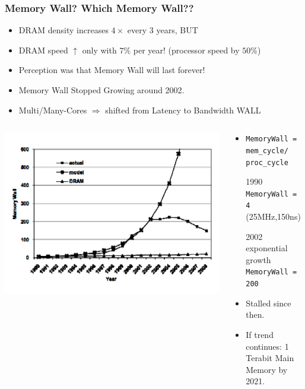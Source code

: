 \documentclass{beamer}
\renewcommand{\emph}[1]{\textcolor{structure}{#1}}
\newcommand{\emp}[1]{\textcolor{DikuRed}{ #1}}
\begin{document}
\begin{frame}[fragile,t]
\frametitle{Memory Wall? Which Memory Wall??}

\begin{itemize}
            \item \emph{DRAM density increases $4\times$ every 3 years, BUT} \smallskip

            \item \emp{DRAM speed $\uparrow$ only with $7\%$ per year!} 
                    (processor speed by $50\%$) 

            \item \alert{Perception was that Memory Wall will last forever!}

            \item \emph{Memory Wall Stopped Growing around 2002}.
    
            \item Multi/Many-Cores $\Rightarrow$ shifted from Latency 
                    to \emp{Bandwidth WALL}
\end  {itemize}
\vspace{-3ex}

\begin{columns}
\includegraphics[width=50ex]{Ch1Figs/MemWall}
\begin{scriptsize}
\begin{itemize}
\item {\tt MemoryWall = mem\_cycle/ proc\_cycle} \smallskip
\item[1990] {\tt MemoryWall = 4} (25MHz,150ns)
\item[2002] exponential growth {\tt MemoryWall = 200} 
\item Stalled since then.
\item If trend continues: 1 Terabit Main Memory by 2021.
\end{itemize}
\end{scriptsize}
\end{columns}

\end{frame}
\end{document}
